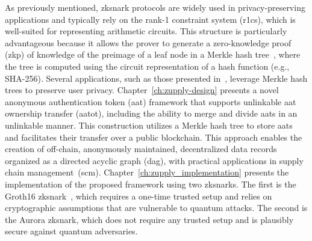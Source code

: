 As previously mentioned, \gls{zksnark} protocols are widely used in privacy-preserving applications and typically rely on the rank-1 constraint system (\gls{r1cs}), which is well-suited for representing arithmetic circuits. This structure is particularly advantageous because it allows the prover to generate a zero-knowledge proof (\gls{zkp}) of knowledge of the preimage of a leaf node in a Merkle hash tree~\cite{Merkle1980}, where the tree is computed using the circuit representation of a hash function (e.g., SHA-256). Several applications, such as those presented in~\cite{zcash-proc,Hawk,williamson2018aztec,ZEXE,Steffen2022Zapper}, leverage Merkle hash trees to preserve user privacy.
Chapter~\ref{ch:zupply-design} presents a novel anonymous authentication token (\gls{aat}) framework that supports unlinkable \gls{aat} ownership transfer (\gls{aatot}), including the ability to merge and divide \glspl{aat} in an unlinkable manner. This construction utilizes a Merkle hash tree to store \glspl{aat} and facilitates their transfer over a public blockchain. This approach enables the creation of off-chain, anonymously maintained, decentralized data records organized as a directed acyclic graph (\gls{dag}), with practical applications in supply chain management~(\gls{scm}). 
Chapter~\ref{ch:zupply_implementation} presents the implementation of the proposed framework using two \glspl{zksnark}. The first is the Groth16 \gls{zksnark}~\cite{Groth2016}, which requires a one-time trusted setup and relies on cryptographic assumptions that are vulnerable to quantum attacks. The second is the Aurora \gls{zksnark}\cite{Aurora2019}, which does not require any trusted setup and is plausibly secure against quantum adversaries.

